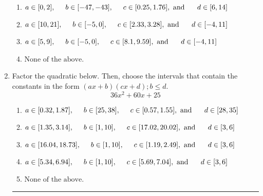 \documentclass[14pt]{extbook}
\newcommand{\litem}[1]{\item#1\hspace*{-1cm}\rule{\textwidth}{0.4pt}}
\begin{document}
\begin{enumerate}
{\begin{enumerate}[label=\Alph*.]
\item \( a \in [0, 2], \hspace*{5mm} b \in [-47, -43], \hspace*{5mm} c \in [0.25, 1.76], \text{ and } \hspace*{5mm} d \in [6, 14] \)
\item \( a \in [10, 21], \hspace*{5mm} b \in [-5, 0], \hspace*{5mm} c \in [2.33, 3.28], \text{ and } \hspace*{5mm} d \in [-4, 11] \)
\item \( a \in [5, 9], \hspace*{5mm} b \in [-5, 0], \hspace*{5mm} c \in [8.1, 9.59], \text{ and } \hspace*{5mm} d \in [-4, 11] \)
\item \( \text{None of the above.} \)

\end{enumerate} }
\litem{
Factor the quadratic below. Then, choose the intervals that contain the constants in the form $(ax+b)(cx+d); b \leq d.$\[ 36x^{2} +60 x + 25 \]\begin{enumerate}[label=\Alph*.]
\item \( a \in [0.32, 1.87], \hspace*{5mm} b \in [25, 38], \hspace*{5mm} c \in [0.57, 1.55], \text{ and } \hspace*{5mm} d \in [28, 35] \)
\item \( a \in [1.35, 3.14], \hspace*{5mm} b \in [1, 10], \hspace*{5mm} c \in [17.02, 20.02], \text{ and } \hspace*{5mm} d \in [3, 6] \)
\item \( a \in [16.04, 18.73], \hspace*{5mm} b \in [1, 10], \hspace*{5mm} c \in [1.19, 2.49], \text{ and } \hspace*{5mm} d \in [3, 6] \)
\item \( a \in [5.34, 6.94], \hspace*{5mm} b \in [1, 10], \hspace*{5mm} c \in [5.69, 7.04], \text{ and } \hspace*{5mm} d \in [3, 6] \)
\item \( \text{None of the above.} \)


\end{enumerate}}
\end{enumerate}
\end{document}
